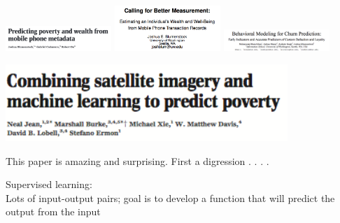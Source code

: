 \documentclass[aspectratio=169]{beamer}
\begin{document}
\begin{frame}

\begin{center}
\includegraphics[width=0.3\textwidth]{figures/blumenstock_predicting_2015_title}
\includegraphics[width=0.3\textwidth]{figures/blumenstock_calling_2014_title}
\includegraphics[width=0.3\textwidth]{figures/khan_behavioral_2015_title}
\end{center}

\end{frame}
\begin{frame}

\begin{center}
\includegraphics[width=0.8\textwidth]{figures/jean_combining_2016_title}
\end{center}

\vfill

This paper is amazing and surprising.  First a digression . . . .

\end{frame}
\begin{frame}

Supervised learning:\\
Lots of input-output pairs; goal is to develop a function that will predict the output from the input

\end{frame}
\end{document}
